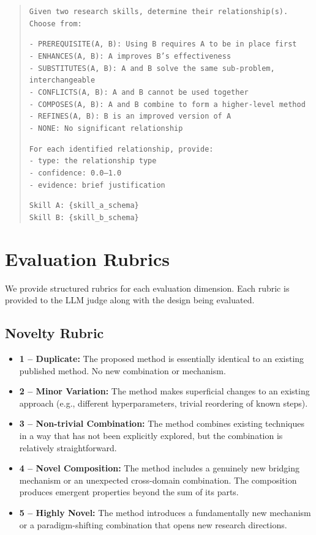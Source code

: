 \begin{quote}
\small
\texttt{Given two research skills, determine their relationship(s). Choose from:}

\texttt{- PREREQUISITE(A, B): Using B requires A to be in place first}\\
\texttt{- ENHANCES(A, B): A improves B's effectiveness}\\
\texttt{- SUBSTITUTES(A, B): A and B solve the same sub-problem, interchangeable}\\
\texttt{- CONFLICTS(A, B): A and B cannot be used together}\\
\texttt{- COMPOSES(A, B): A and B combine to form a higher-level method}\\
\texttt{- REFINES(A, B): B is an improved version of A}\\
\texttt{- NONE: No significant relationship}

\texttt{For each identified relationship, provide:}\\
\texttt{- type: the relationship type}\\
\texttt{- confidence: 0.0--1.0}\\
\texttt{- evidence: brief justification}

\texttt{Skill A: \{skill\_a\_schema\}}\\
\texttt{Skill B: \{skill\_b\_schema\}}
\end{quote}

\section{Evaluation Rubrics}
\label{app:rubrics}

We provide structured rubrics for each evaluation dimension. Each rubric is provided to the LLM judge along with the design being evaluated.

\subsection{Novelty Rubric}
\begin{itemize}[leftmargin=*]
\item \textbf{1 -- Duplicate:} The proposed method is essentially identical to an existing published method. No new combination or mechanism.
\item \textbf{2 -- Minor Variation:} The method makes superficial changes to an existing approach (e.g., different hyperparameters, trivial reordering of known steps).
\item \textbf{3 -- Non-trivial Combination:} The method combines existing techniques in a way that has not been explicitly explored, but the combination is relatively straightforward.
\item \textbf{4 -- Novel Composition:} The method includes a genuinely new bridging mechanism or an unexpected cross-domain combination. The composition produces emergent properties beyond the sum of its parts.
\item \textbf{5 -- Highly Novel:} The method introduces a fundamentally new mechanism or a paradigm-shifting combination that opens new research directions.
\end{itemize}

